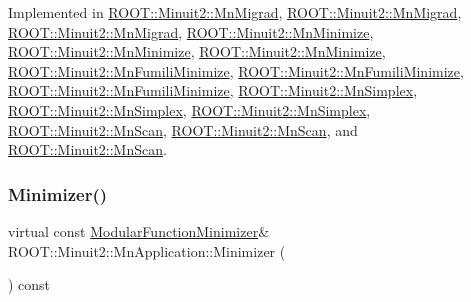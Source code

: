 Implemented in \mbox{\hyperlink{classROOT_1_1Minuit2_1_1MnMigrad_a98fa0ce74bf180a287093ac677e8644c}{R\+O\+O\+T\+::\+Minuit2\+::\+Mn\+Migrad}}, \mbox{\hyperlink{classROOT_1_1Minuit2_1_1MnMigrad_a98fa0ce74bf180a287093ac677e8644c}{R\+O\+O\+T\+::\+Minuit2\+::\+Mn\+Migrad}}, \mbox{\hyperlink{classROOT_1_1Minuit2_1_1MnMigrad_a98fa0ce74bf180a287093ac677e8644c}{R\+O\+O\+T\+::\+Minuit2\+::\+Mn\+Migrad}}, \mbox{\hyperlink{classROOT_1_1Minuit2_1_1MnMinimize_a879bb789f98c72f9a90a327fc7bb48fd}{R\+O\+O\+T\+::\+Minuit2\+::\+Mn\+Minimize}}, \mbox{\hyperlink{classROOT_1_1Minuit2_1_1MnMinimize_a879bb789f98c72f9a90a327fc7bb48fd}{R\+O\+O\+T\+::\+Minuit2\+::\+Mn\+Minimize}}, \mbox{\hyperlink{classROOT_1_1Minuit2_1_1MnMinimize_a879bb789f98c72f9a90a327fc7bb48fd}{R\+O\+O\+T\+::\+Minuit2\+::\+Mn\+Minimize}}, \mbox{\hyperlink{classROOT_1_1Minuit2_1_1MnFumiliMinimize_a96eb0cf96ae7ec874f912b6d2b3e7990}{R\+O\+O\+T\+::\+Minuit2\+::\+Mn\+Fumili\+Minimize}}, \mbox{\hyperlink{classROOT_1_1Minuit2_1_1MnFumiliMinimize_a96eb0cf96ae7ec874f912b6d2b3e7990}{R\+O\+O\+T\+::\+Minuit2\+::\+Mn\+Fumili\+Minimize}}, \mbox{\hyperlink{classROOT_1_1Minuit2_1_1MnFumiliMinimize_a96eb0cf96ae7ec874f912b6d2b3e7990}{R\+O\+O\+T\+::\+Minuit2\+::\+Mn\+Fumili\+Minimize}}, \mbox{\hyperlink{classROOT_1_1Minuit2_1_1MnSimplex_a8fa3495353e667d85e7dbeaffa94b94c}{R\+O\+O\+T\+::\+Minuit2\+::\+Mn\+Simplex}}, \mbox{\hyperlink{classROOT_1_1Minuit2_1_1MnSimplex_a8fa3495353e667d85e7dbeaffa94b94c}{R\+O\+O\+T\+::\+Minuit2\+::\+Mn\+Simplex}}, \mbox{\hyperlink{classROOT_1_1Minuit2_1_1MnSimplex_a8fa3495353e667d85e7dbeaffa94b94c}{R\+O\+O\+T\+::\+Minuit2\+::\+Mn\+Simplex}}, \mbox{\hyperlink{classROOT_1_1Minuit2_1_1MnScan_a9bebaf56360ff70aac6f47590227d8b5}{R\+O\+O\+T\+::\+Minuit2\+::\+Mn\+Scan}}, \mbox{\hyperlink{classROOT_1_1Minuit2_1_1MnScan_a9bebaf56360ff70aac6f47590227d8b5}{R\+O\+O\+T\+::\+Minuit2\+::\+Mn\+Scan}}, and \mbox{\hyperlink{classROOT_1_1Minuit2_1_1MnScan_a9bebaf56360ff70aac6f47590227d8b5}{R\+O\+O\+T\+::\+Minuit2\+::\+Mn\+Scan}}.

\mbox{\label{classROOT_1_1Minuit2_1_1MnApplication_a5a8e1e2658b731b5f4023dd1b1594223}} 
\subsubsection{\texorpdfstring{Minimizer()}{Minimizer()}\hspace{0.1cm}{\footnotesize\ttfamily [2/3]}}
{\footnotesize\ttfamily virtual const \mbox{\hyperlink{classROOT_1_1Minuit2_1_1ModularFunctionMinimizer}{Modular\+Function\+Minimizer}}\& R\+O\+O\+T\+::\+Minuit2\+::\+Mn\+Application\+::\+Minimizer (\begin{DoxyParamCaption}{ }\end{DoxyParamCaption}) const\hspace{0.3cm}{\ttfamily [pure virtual]}}



